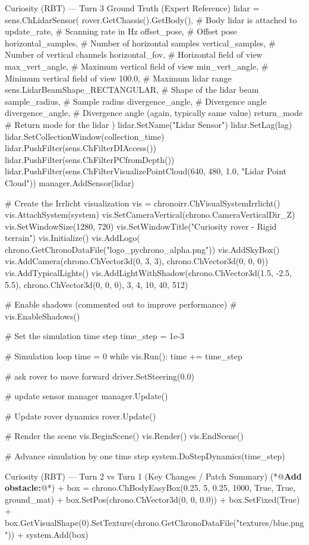 \documentclass{ieeeaccess}
\begin{document}
\begin{appendices}
\begin{CodeBlock}[breakable]{Curiosity (RBT) --- Turn 3 Ground Truth (Expert Reference)}
lidar = sens.ChLidarSensor(
    rover.GetChassis().GetBody(),              # Body lidar is attached to
    update_rate,            # Scanning rate in Hz
    offset_pose,            # Offset pose
    horizontal_samples,     # Number of horizontal samples
    vertical_samples,       # Number of vertical channels
    horizontal_fov,         # Horizontal field of view
    max_vert_angle,         # Maximum vertical field of view
    min_vert_angle,         # Minimum vertical field of view
    100.0,                  # Maximum lidar range
    sens.LidarBeamShape_RECTANGULAR,  # Shape of the lidar beam
    sample_radius,          # Sample radius
    divergence_angle,       # Divergence angle
    divergence_angle,       # Divergence angle (again, typically same value)
    return_mode             # Return mode for the lidar
)
lidar.SetName("Lidar Sensor")
lidar.SetLag(lag)
lidar.SetCollectionWindow(collection_time)
lidar.PushFilter(sens.ChFilterDIAccess())
lidar.PushFilter(sens.ChFilterPCfromDepth())
lidar.PushFilter(sens.ChFilterVisualizePointCloud(640, 480, 1.0, "Lidar Point Cloud"))
manager.AddSensor(lidar)

# Create the Irrlicht visualization
vis = chronoirr.ChVisualSystemIrrlicht()
vis.AttachSystem(system)
vis.SetCameraVertical(chrono.CameraVerticalDir_Z)
vis.SetWindowSize(1280, 720)
vis.SetWindowTitle("Curiosity rover - Rigid terrain")
vis.Initialize()
vis.AddLogo(
    chrono.GetChronoDataFile("logo_pychrono_alpha.png"))
vis.AddSkyBox()
vis.AddCamera(chrono.ChVector3d(0, 3, 3), chrono.ChVector3d(0, 0, 0))
vis.AddTypicalLights()
vis.AddLightWithShadow(chrono.ChVector3d(1.5, -2.5, 5.5), chrono.ChVector3d(0, 0, 0), 3, 4, 10, 40, 512)

# Enable shadows (commented out to improve performance)
# vis.EnableShadows()

# Set the simulation time step
time_step = 1e-3

# Simulation loop
time = 0
while vis.Run():
    time += time_step

    # ask rover to move forward
    driver.SetSteering(0.0)

    # update sensor manager
    manager.Update()
    
    # Update rover dynamics
    rover.Update()

    # Render the scene
    vis.BeginScene()
    vis.Render()
    vis.EndScene()

    # Advance simulation by one time step
    system.DoStepDynamics(time_step)
\end{CodeBlock}
\begin{DiffBlock}{Curiosity (RBT) --- Turn 2 vs Turn 1 (Key Changes / Patch Summary)}
    (*@\textbf{Add obstacle:}@*)
    + box = chrono.ChBodyEasyBox(0.25, 5, 0.25, 1000, True, True, ground_mat)
    + box.SetPos(chrono.ChVector3d(0, 0, 0.0))
    + box.SetFixed(True)
    + box.GetVisualShape(0).SetTexture(chrono.GetChronoDataFile("textures/blue.png"))
    + system.Add(box)
    

\end{DiffBlock}
\end{appendices}
\end{document}
